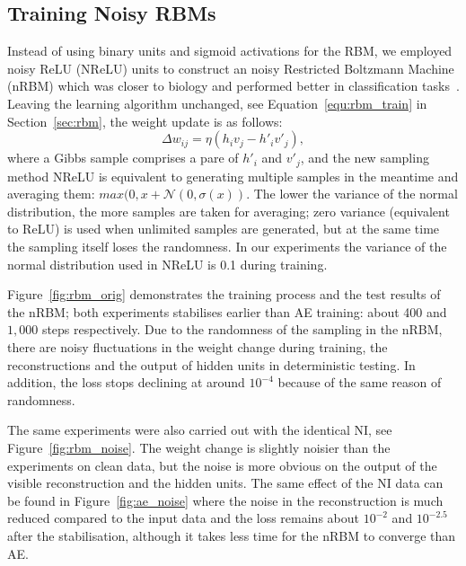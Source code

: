 \subsection[Noisy RBMs]{Training Noisy RBMs}
\label{subsec:exp_RBM}
Instead of using binary units and sigmoid activations for the RBM, we employed noisy ReLU (NReLU) units to construct an noisy Restricted Boltzmann Machine (nRBM) which was closer to biology and performed better in classification tasks~\citep{nair2010rectified}.
Leaving the learning algorithm unchanged, see Equation~\ref{equ:rbm_train} in Section~\ref{sec:rbm}, the weight update is as follows:
\begin{equation}
\Delta w_{ij} = \eta (h_iv_j - h'_iv'_j),
\label{equ:rbm}
\end{equation} 
where a Gibbs sample comprises a pare of $h'_i$ and $v'_j$, and the new sampling method NReLU is equivalent to generating multiple samples in the meantime and averaging them: $max(0, x+\mathcal{N}(0, \sigma(x))$.
The lower the variance of the normal distribution, the more samples are taken for averaging;
zero variance (equivalent to ReLU) is used when unlimited samples are generated, but at the same time the sampling itself loses the randomness.
In our experiments the variance of the normal distribution used in NReLU is 0.1 during training.


Figure~\ref{fig:rbm_orig} demonstrates the training process and the test results of the nRBM; both experiments stabilises earlier than AE training: about 400 and $1,000$ steps respectively.
Due to the randomness of the sampling in the nRBM, there are noisy fluctuations in the weight change during training, the reconstructions and the output of hidden units in deterministic testing.
In addition, the loss stops declining at around $10^{-4}$ because of the same reason of randomness.

The same experiments were also carried out with the identical NI, see Figure~\ref{fig:rbm_noise}.
The weight change is slightly noisier than the experiments on clean data, but the noise is more obvious on the output of the visible reconstruction and the hidden units.
The same effect of the NI data can be found in Figure~\ref{fig:ae_noise} where the noise in the reconstruction is much reduced compared to the input data and the loss remains about $10^{-2}$ and $10^{-2.5}$ after the stabilisation, although it takes less time for the nRBM to converge than AE.


